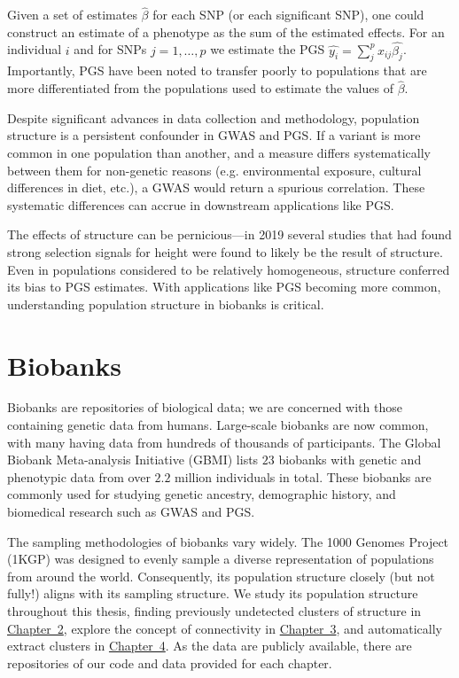 Given a set of estimates $\hat{\beta}$ for each SNP (or each significant SNP), one could construct an estimate of a phenotype as the sum of the estimated effects. For an individual $i$ and for SNPs $j = 1, \dots, p$ we estimate the PGS $\hat{y_{i}} = \sum_{j}^{p}x_{ij}\hat{\beta_{j}}$. Importantly, PGS have been noted to transfer poorly to populations that are more differentiated from the populations used to estimate the values of $\hat{\beta}$\citep{wang_theoretical_2020}.

Despite significant advances in data collection and methodology, population structure is a persistent confounder in GWAS and PGS. If a variant is more common in one population than another, and a measure differs systematically between them for non-genetic reasons (e.g. environmental exposure, cultural differences in diet, etc.), a GWAS would return a spurious correlation\citep{price_principal_2006}. These systematic differences can accrue in downstream applications like PGS\citep{zaidi_demographic_2020}. 

The effects of structure can be pernicious---in 2019 several studies that had found strong selection signals for height were found to likely be the result of structure\citep{berg_reduced_2019}. Even in populations considered to be relatively homogeneous, structure conferred its bias to PGS estimates\citep{kerminen_geographic_2019}. With applications like PGS becoming more common, understanding population structure in biobanks is critical\citep{kaplan_polygenic_2022}.

\section{Biobanks}

Biobanks are repositories of biological data; we are concerned with those containing genetic data from humans. Large-scale biobanks are now common, with many having data from hundreds of thousands of participants. The Global Biobank Meta-analysis Initiative (GBMI) lists $23$ biobanks with genetic and phenotypic data from over $2.2$ million individuals in total\citep{zhou_global_2022}. These biobanks are commonly used for studying genetic ancestry, demographic history, and biomedical research such as GWAS and PGS.

The sampling methodologies of biobanks vary widely. The 1000 Genomes Project (1KGP)\citep{global_2015} was designed to evenly sample a diverse representation of populations from around the world. Consequently, its population structure closely (but not fully!) aligns with its sampling structure. We study its population structure throughout this thesis, finding previously undetected clusters of structure in \hyperref[chap:chapter2]{Chapter~2}, explore the concept of connectivity in \hyperref[chap:chapter3]{Chapter~3}, and automatically extract clusters in \hyperref[chap:chapter4]{Chapter~4}. As the data are publicly available, there are repositories of our code and data provided for each chapter.

